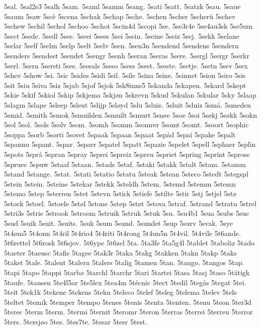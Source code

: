 5sal.
5sal2s3
5salh
5sam.
5saml
5samm
5sang.
5sati
5satt.
5satzk
5sau.
5saue
5saum
5saw
5scè
5scena
5schak
5schap
5sche.
5schen
5scher
5scherü
5schev
5schew
5schil
5schol
5schoo
5schot
5scin4d
5scopi
5se.
5se3r4e
5se4au3sk
5se5um
5sect
5sede.
5sedl
5see.
5seei
5sees
5sei
5sein.
5seine
5seiz
5sej.
5sekk
5selane
5selar
5self
5selm
5selp
5selt
5selv
5sen.
5sen3n
5sendend
5sendens
5sendern
5senders
5sendest
5sendet
5sengr
5senh
5seran
5seras
5sere.
5sergl
5sergr
5serkr
5serl.
5sern
5sersti
5ses.
5sesals
5seso
5sess
5sest.
5seste.
5setje.
5setn
5sev
5sex
5shev
5show
5si.
5sic
5sides
5sidi
5sil.
5sile
5sina
5sine.
5sinnet
5sion
5siro
5sis
5sit
5siu
5siva
5siz
5sjab
5sjof
5sjok
5sk8inns5
5skanda
5skapen.
5skard
5skept
5skie
5skif
5skiol
5skip
5skjema
5skjøn
5skrevn
5skud
5skulan
5skular
5sky
5slaap
5slagm
5slape
5sleep
5sleut
5slijp
5sløyd
5slu
5sluis.
5sluit
5sluiz
5små.
5smeden
5smid.
5smith
5smok
5smuilden
5smuilt
5smurt
5snøe
5soe
5soi
5søkj
5søkk
5sokn
5sol
5sol.
5sols
5solv
5som.
5somh
5somm
5somrer
5somt
5somt.
5soort
5sophic
5soppa
5sorb
5sorti
5sovet
5spaak
5spaan
5spaat
5spåd
5spai
5spake
5spalt
5spannu
5spant.
5spar.
5sparr
5spatel
5spatt
5spazie
5spelet
5spell
5sphaer
5splin
5spots
5språ
5spran
5spray
5sprei
5spreiz
5spreu
5spriet
5spring
5sprint
5spross
5spruec
5spuw
5staaf
5staan.
5stads
5staf.
5staki
5stakk
5stalt
5stam.
5stamm
5stand
5stange.
5stat.
5stati
5statio
5statu
5steak
5stean
5steco
5stedt
5stegspl
5stein
5stein.
5steine
5stekar
5stekk
5steldh
5stem.
5stemd
5stemm
5stemn
5stemo
5step
5sterren
5stet
5stevn
5stick
5stiefe
5stilte
5stir
5stj
5stjel
5stø
5stock
5stoel.
5stoele
5støl
5stone
5støp
5støt
5stova
5straf.
5strand
5stratu
5strel
5stri3s
5strie
5strook
5stroom
5struik
5struk
5stuk
5su.
5su4b1
5sua
5subs
5suc
5sud
5suik
5suit.
5suits.
5suk
5sum
5sund.
5sundet
5sup
5surv
5svak.
5sye
5t4øm5
5t4onn
5t4ril
5t4rio4
5t4riti
5t4rong
5t4un5n
5t4vil.
5t4vile
5t6ande.
5t6rettel
5t6rosk
5t6sjov.
5t6ype
5t6zel
5ta.
5ta3fe
5ta5g4l
5tablet
5taboliz
5tado
5taeter
5taeusc
5tafis
5tagee
5tak3r
5taka
5takg
5takken
5takn
5takp
5taks
5takst
5tale.
5talent
5talern
5talers
5talig
5tamen
5tan.
5tango.
5tangos
5tap.
5tapi
5tapo
5tappi
5tarbø
5tarchl
5tarchr
5tari
5tartei
5tasa
5tasj
5taso
5tätigk
5taufe.
5tausen
5te4l5ar
5te5lex
5tea4m
5técnic
5tect
5tedil
5tegås
5tegat
5tei.
5teit
5tek1k
5tekene
5tekens
5tekn
5teleco
5telef
5teleg
5telema
5telev
5tels
5teltet
5temik
5temper
5tempo
5tenes
5tenis
5tenta
5tenten.
5tenu
5teon
5ter3d
5terec
5term
5term.
5termi
5ternit
5teromr
5teron
5terras
5terrei
5terreu
5terror
5ters.
5tersjøo
5tes.
5tes7te.
5tesar
5tesr
5test.
